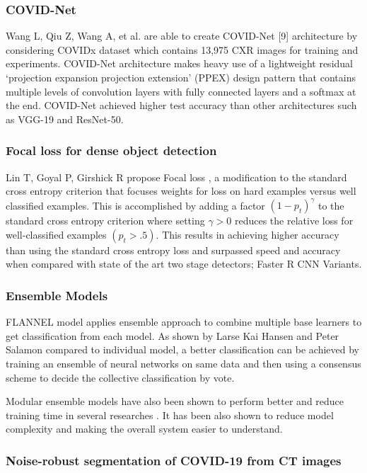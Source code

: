 \documentclass{sigkddExp}
\begin{document}
\subsubsection{COVID-Net}

Wang L, Qiu Z, Wang A, et al. are able to create COVID-Net [9] architecture by
considering COVIDx dataset which contains 13,975 CXR images for training and
experiments. COVID-Net architecture makes heavy use of a lightweight residual
‘projection expansion projection extension’ (PPEX) design pattern that contains
multiple levels of convolution layers with fully connected layers and a softmax
at the end. COVID-Net achieved higher test accuracy than other architectures
such as VGG-19 and ResNet-50.


\subsubsection{Focal loss for dense object detection}

Lin T, Goyal P, Girshick R propose Focal loss \cite{lin2018focal}, a
modification to the standard cross entropy criterion that focuses weights for
loss on hard examples versus well classified examples. This is accomplished by
adding a factor $(1 - p_t)^\gamma$ to the standard cross entropy criterion where
setting $\gamma  > 0$ reduces the relative loss for well-classified examples
$(p_t > .5)$. This results in achieving higher accuracy than using the standard
cross entropy loss and surpassed speed and accuracy when compared with state of
the art two stage detectors; Faster R CNN Variants.

\subsubsection{Ensemble Models}

FLANNEL model applies ensemble approach to combine multiple base learners to get
classification from each model. As shown by Larse Kai Hansen and Peter Salamon
\cite{58871} compared to individual model, a better classification can be achieved
by training an ensemble of neural networks on same data and then using a
consensus scheme to decide the collective classification by vote.

Modular ensemble models have also been shown to perform better and reduce
training time in several researches \cite{combine}. It has been also shown to
reduce model complexity and making the overall system easier to understand.


\subsubsection{Noise-robust segmentation of COVID-19 from CT images}
\end{document}
